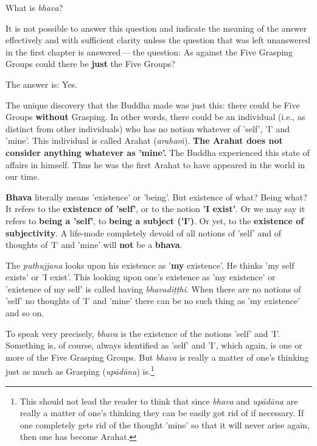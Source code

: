 What is \emph{bhava}?

It is not possible to answer this question and indicate the meaning of the answer effectively and with sufficient clarity unless the question that was left unanswered in the first chapter is answered --- the question: As against the Five Grasping Groups could there be \textbf{just} the Five Groups?

The answer is: Yes.

The unique discovery that the Buddha made was just this: there could be Five Groups \textbf{without} Grasping. In other words, there could be an individual (i.e., as distinct from other individuals) who has no notion whatever of 'self', 'I' and 'mine'. This individual is called Arahat (\emph{arahaṁ}). \textbf{The Arahat does not consider anything whatever as 'mine'.} The Buddha experienced this state of affairs in himself. Thus he was the first Arahat to have appeared in the world in our time.

\textbf{Bhava} literally means 'existence' or 'being'. But existence of what? Being what? It refers to the \textbf{existence of 'self'}, or to the notion \textbf{'I exist'}. Or we may say it refers to \textbf{being a 'self'}, to \textbf{being a subject ('I')}. Or yet, to the \textbf{existence of subjectivity}. A life-mode completely devoid of all notions of 'self' and of thoughts of 'I' and 'mine' will \textbf{not} be a \textbf{bhava}.

The \emph{puthujjana} looks upon his existence as '\textbf{my} existence'. He thinks 'my self exists' or 'I exist'. This looking upon one's existence as 'my existence' or 'existence of my self' is called having \emph{bhavadiṭṭhi}. When there are no notions of 'self' no thoughts of 'I' and 'mine' there can be no such thing as 'my existence' and so on.

To speak very precisely, \emph{bhava} is the existence of the notions 'self' and 'I'. Something is, of course, always identified as 'self' and 'I', which again, is one or more of the Five Grasping Groups. But \emph{bhava} is really a matter of one's thinking just as much as Grasping (\emph{upādāna}) is.\footnote{This should not lead the reader to think that since \emph{bhava} and \emph{upādāna} are really a matter of one's thinking they can be easily got rid of if necessary. If one completely gets rid of the thought 'mine' so that it will never arise again, then one has become Arahat.}


